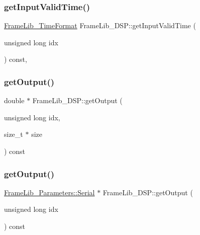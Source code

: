 \mbox{\label{class_frame_lib___d_s_p_a699dda68553ddebd5ca8c70326fb40a5}} 
\subsubsection{\texorpdfstring{get\+Input\+Valid\+Time()}{getInputValidTime()}}
{\footnotesize\ttfamily \hyperlink{struct_frame_lib___time_format}{Frame\+Lib\+\_\+\+Time\+Format} Frame\+Lib\+\_\+\+D\+S\+P\+::get\+Input\+Valid\+Time (\begin{DoxyParamCaption}\item[{unsigned long}]{idx }\end{DoxyParamCaption}) const\hspace{0.3cm}{\ttfamily [inline]}, {\ttfamily [protected]}}

\mbox{\label{class_frame_lib___d_s_p_a5d72363b6d5ee02e0c52e499fd28205d}} 
\subsubsection{\texorpdfstring{get\+Output()}{getOutput()}\hspace{0.1cm}{\footnotesize\ttfamily [1/2]}}
{\footnotesize\ttfamily double $\ast$ Frame\+Lib\+\_\+\+D\+S\+P\+::get\+Output (\begin{DoxyParamCaption}\item[{unsigned long}]{idx,  }\item[{size\+\_\+t $\ast$}]{size }\end{DoxyParamCaption}) const\hspace{0.3cm}{\ttfamily [protected]}}

\mbox{\label{class_frame_lib___d_s_p_a18dc23246a8c9d67a0cc468e782fd5c3}} 
\subsubsection{\texorpdfstring{get\+Output()}{getOutput()}\hspace{0.1cm}{\footnotesize\ttfamily [2/2]}}
{\footnotesize\ttfamily \hyperlink{class_frame_lib___parameters_1_1_serial}{Frame\+Lib\+\_\+\+Parameters\+::\+Serial} $\ast$ Frame\+Lib\+\_\+\+D\+S\+P\+::get\+Output (\begin{DoxyParamCaption}\item[{unsigned long}]{idx }\end{DoxyParamCaption}) const\hspace{0.3cm}{\ttfamily [protected]}}

